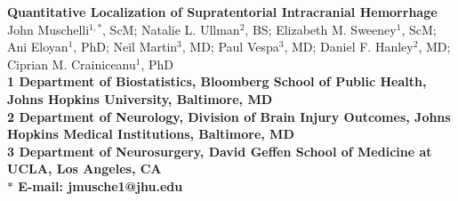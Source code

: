 \documentclass[12pt]{article}
\date{}
\begin{document}
\begin{refsection} %
\thispagestyle{empty}

\newpage 
\begin{flushleft}
{\Large
\textbf{Quantitative Localization of Supratentorial Intracranial Hemorrhage}
}
\\
John Muschelli$^{1,\ast}$, ScM;
Natalie L. Ullman$^{2}$, BS;
Elizabeth M. Sweeney$^{1}$, ScM;
Ani Eloyan$^{1}$, PhD; 
Neil Martin$^{3}$, MD;
Paul Vespa$^{3}$, MD;
Daniel F. Hanley$^{2}$, MD;
Ciprian M. Crainiceanu$^{1}$, PhD
\\
\bf{1} Department of Biostatistics, Bloomberg School of Public Health, Johns Hopkins University, Baltimore, MD
\\
\bf{2} Department of Neurology, Division of Brain Injury Outcomes,  Johns Hopkins Medical Institutions, Baltimore, MD
\\
\bf{3} Department of Neurosurgery, David Geffen School of Medicine at UCLA, Los Angeles, CA
\\
$\ast$ E-mail: jmusche1@jhu.edu
\end{flushleft}



\newpage 




\begin{knitrout}
\color{fgcolor}\begin{kframe}


{\ttfamily\noindent\bfseries{}}

{\ttfamily\noindent\bfseries\color{errorcolor}{Error in merge(demog, imag, all = TRUE): object 'demog' not found}}

{\ttfamily\noindent\bfseries\color{errorcolor}{Error in merge(demog, alldemog, all.x = TRUE): object 'demog' not found}}

{\ttfamily\noindent\bfseries\color{errorcolor}{Error in nrow(demog): object 'demog' not found}}


\end{kframe}
\end{knitrout}
\end{refsection}
\end{document}

